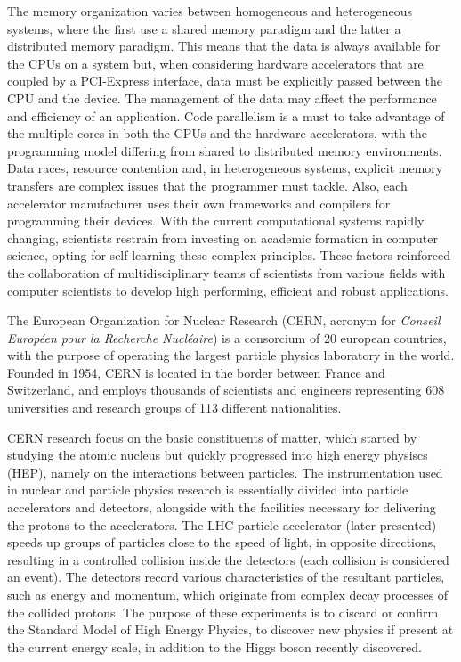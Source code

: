 The memory organization varies between homogeneous and heterogeneous systems, where the first use a shared memory paradigm and the latter a distributed memory paradigm. This means that the data is always available for the CPUs on a system but, when considering hardware accelerators that are coupled by a PCI-Express interface, data must be explicitly passed between the CPU and the device. The management of the data may affect the performance and efficiency of an application. Code parallelism is a must to take advantage of the multiple cores in both the CPUs and the hardware accelerators, with the programming model differing from shared to distributed memory environments. Data races, resource contention and, in heterogeneous systems, explicit memory transfers are complex issues that the programmer must tackle. Also, each accelerator manufacturer uses their own frameworks and compilers for programming their devices. With the current computational systems rapidly changing, scientists restrain from investing on academic formation in computer science, opting for self-learning these complex principles. These factors reinforced the collaboration of multidisciplinary teams of scientists from various fields with computer scientists to develop high performing, efficient and robust applications.

The European Organization for Nuclear Research \cite{CERN} (CERN, acronym for \textit{Conseil Européen pour la Recherche Nucléaire}) is a consorcium of 20 european countries, with the purpose of operating the largest particle physics laboratory in the world. Founded in 1954, CERN is located in the border between France and Switzerland, and employs thousands of scientists and engineers representing 608 universities and research groups of 113 different nationalities.

CERN research focus on the basic constituents of matter, which started by studying the atomic nucleus but quickly progressed into high energy physiscs (HEP), namely on the interactions between particles. The instrumentation used in nuclear and particle physics research is essentially divided into particle accelerators and detectors, alongside with the facilities necessary for delivering the protons to the accelerators. The LHC particle accelerator (later presented) speeds up groups of particles close to the speed of light, in opposite directions, resulting in a controlled collision inside the detectors (each collision is considered an event). The detectors record various characteristics of the resultant particles, such as energy and momentum, which originate from complex decay processes of the collided protons. The purpose of these experiments is to discard or confirm the Standard Model of High Energy Physics, to discover new physics if present at the current energy scale, in addition to the Higgs boson recently discovered.

